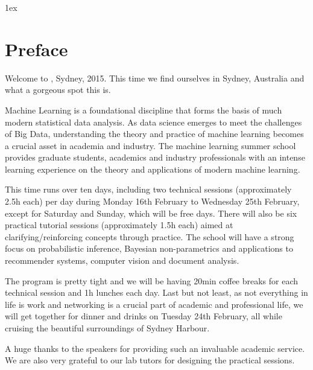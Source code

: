 {}
%
{\parskip 1ex
\section*{Preface}



                                                                     
                                             
Welcome to \mlss, Sydney, 2015. This time we find ourselves in Sydney, Australia and what a gorgeous spot this is.

Machine Learning is a foundational discipline that forms the basis of much modern statistical data analysis. As data science emerges to meet the challenges of Big Data, understanding the theory and practice of machine learning becomes a crucial asset in academia and industry.
The machine learning summer school provides graduate students, academics and industry professionals with an intense learning experience on the theory and applications of modern machine learning. 

This time \mlss runs over ten days, including two technical sessions (approximately 2.5h each) per day during Monday 16th February to Wednesday 25th February, except for Saturday and Sunday, which will be free days. There will also be six practical tutorial sessions (approximately 1.5h each) aimed at clarifying/reinforcing concepts through practice. The school will have a strong focus on probabilistic inference,  Bayesian non-parametrics and applications to recommender systems, computer vision and document analysis. 

The program is pretty tight and we will be having 20min coffee breaks for each technical session and 1h lunches each day.  Last but not least, as not everything in life is work and networking is a crucial part of academic and professional life, we will get together for dinner and drinks on Tuesday 24th February, all while  cruising the  beautiful surroundings of  Sydney Harbour.

A huge thanks to the speakers for providing such an invaluable academic service. We are also very grateful to our lab tutors for designing the practical sessions. 

}
